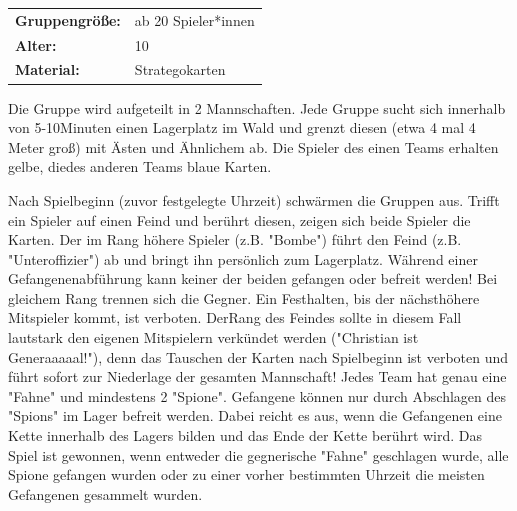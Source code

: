 \newpage

\begin{table}[H]
\begin{tabular}{>{\bfseries}lp{8cm}}
   Gruppengröße:   & ab 20 Spieler*innen\\
    Alter: & 10 \\
    Material: & Strategokarten \\
\end{tabular}
\end{table} 

Die Gruppe wird aufgeteilt in 2 Mannschaften. Jede Gruppe sucht sich innerhalb von 5-10Minuten einen Lagerplatz im Wald  und  grenzt  diesen  (etwa  4  mal  4  Meter  groß)  mit Ästen  und  Ähnlichem  ab.  Die  Spieler  des  einen  Teams erhalten gelbe, diedes anderen Teams blaue Karten.\newline \newline

Nach Spielbeginn (zuvor festgelegte Uhrzeit) schwärmen die  Gruppen  aus.  Trifft  ein  Spieler  auf  einen  Feind  und berührt diesen, zeigen sich beide Spieler die Karten. Der im  Rang  höhere  Spieler  (z.B.  "Bombe")  führt  den  Feind (z.B.  "Unteroffizier")  ab  und  bringt  ihn  persönlich  zum Lagerplatz.  Während  einer  Gefangenenabführung  kann keiner  der  beiden  gefangen  oder  befreit  werden!  Bei gleichem  Rang  trennen  sich  die  Gegner.  Ein  Festhalten, bis der nächsthöhere Mitspieler kommt, ist verboten. DerRang  des  Feindes  sollte  in  diesem  Fall  lautstark  den eigenen   Mitspielern   verkündet   werden   ("Christian   ist Generaaaaal!"),   denn   das   Tauschen   der   Karten   nach Spielbeginn  ist  verboten  und  führt  sofort  zur  Niederlage der  gesamten  Mannschaft!  Jedes  Team  hat  genau  eine "Fahne"  und  mindestens  2  "Spione".  Gefangene  können nur  durch  Abschlagen  des  "Spions"  im  Lager  befreit werden.  Dabei  reicht  es aus,  wenn  die  Gefangenen  eine Kette innerhalb des Lagers bilden und das Ende der Kette berührt wird. Das Spiel ist gewonnen, wenn entweder die gegnerische   "Fahne"   geschlagen   wurde,   alle   Spione gefangen   wurden   oder   zu   einer   vorher   bestimmten Uhrzeit die meisten Gefangenen gesammelt wurden.\\ 

